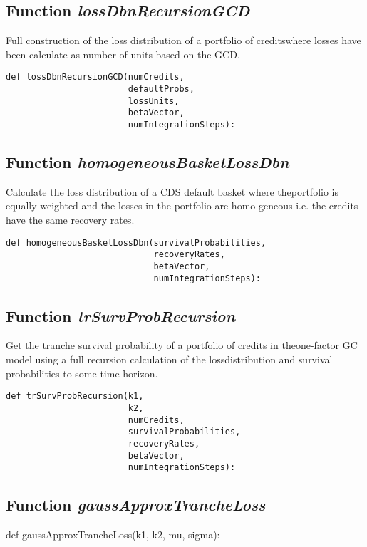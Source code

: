 \documentclass[twoside,11pt]{book}
\begin{document}
\subsection{Function {\it lossDbnRecursionGCD}}
Full construction of the loss distribution of a portfolio of creditswhere losses have been calculate as number of units based on the GCD. 

\begin{lstlisting}
def lossDbnRecursionGCD(numCredits,
                        defaultProbs,
                        lossUnits,
                        betaVector,
                        numIntegrationSteps):
\end{lstlisting}

\subsection{Function {\it homogeneousBasketLossDbn}}
Calculate the loss distribution of a CDS default basket where theportfolio is equally weighted and the losses in the portfolio are homo-geneous i.e. the credits have the same recovery rates. 

\begin{lstlisting}
def homogeneousBasketLossDbn(survivalProbabilities,
                             recoveryRates,
                             betaVector,
                             numIntegrationSteps):
\end{lstlisting}

\subsection{Function {\it trSurvProbRecursion}}
Get the tranche survival probability of a portfolio of credits in theone-factor GC model using a full recursion calculation of the lossdistribution and survival probabilities to some time horizon. 

\begin{lstlisting}
def trSurvProbRecursion(k1,
                        k2,
                        numCredits,
                        survivalProbabilities,
                        recoveryRates,
                        betaVector,
                        numIntegrationSteps):
\end{lstlisting}

\subsection{Function {\it gaussApproxTrancheLoss}}
def gaussApproxTrancheLoss(k1, k2, mu, sigma):
\end{document}

